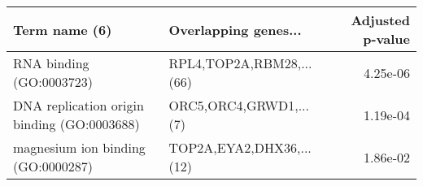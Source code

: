 \begin{tabular}{llr}
\toprule
                              Term name (6) &     Overlapping genes... &  Adjusted p-value \\
\midrule
                   RNA binding (GO:0003723) & RPL4,TOP2A,RBM28,...(66) &          4.25e-06 \\
DNA replication origin binding (GO:0003688) &   ORC5,ORC4,GRWD1,...(7) &          1.19e-04 \\
         magnesium ion binding (GO:0000287) & TOP2A,EYA2,DHX36,...(12) &          1.86e-02 \\
\bottomrule
\end{tabular}
